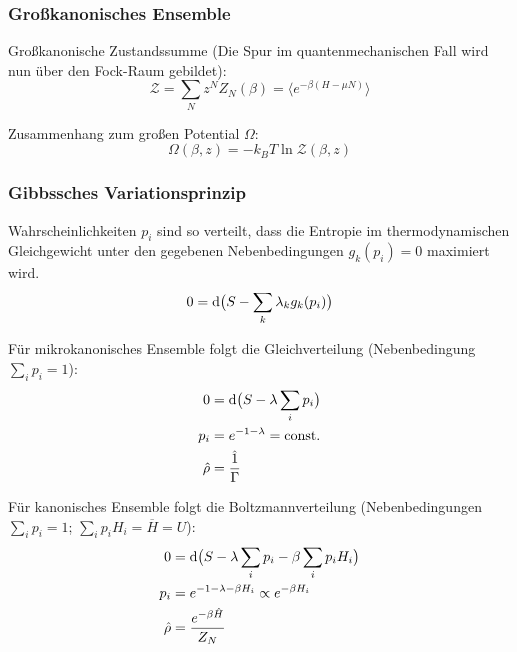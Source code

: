 		\subsubsection{Großkanonisches Ensemble}
			\noindent
			Großkanonische Zustandssumme (Die Spur im quantenmechanischen Fall wird nun über den Fock-Raum gebildet):
			\begin{equation}
				\mathcal{Z} = \sum_N z^N Z_N(\beta) = \langle e^{-\beta(H-\mu N)} \rangle
			\end{equation}

			\noindent
			Zusammenhang zum großen Potential $\Omega$:
			\begin{equation}
				\Omega(\beta,z) = -k_B T \ln \mathcal{Z}(\beta,z)
			\end{equation}


		\subsubsection{Gibbssches Variationsprinzip}
			\noindent
			Wahrscheinlichkeiten $p_i$ sind so verteilt, dass die Entropie im thermodynamischen Gleichgewicht unter den gegebenen Nebenbedingungen $g_k(p_i) = 0$ maximiert wird.
			\begin{equation}
				0 = \mathrm{d} \big( S - \sum_k \lambda_k g_k(p_i) \big)
			\end{equation}

			\noindent
			Für mikrokanonisches Ensemble folgt die Gleichverteilung (Nebenbedingung $\sum_i p_i = 1$):
			\begin{equation}
				\begin{aligned}
					0 &= \diff \big( S - \lambda \sum_i p_i \big) \\
					p_i &= e^{-1-\lambda} = \const \\
					\hat{\rho} &= \frac{\hat{1}}{\Gamma} \\ %
				\end{aligned}
			\end{equation}

			\noindent
			Für kanonisches Ensemble folgt die Boltzmannverteilung (Nebenbedingungen $\sum_i p_i = 1$; $\sum_i p_i H_i = \overline{H} = U$):
			\begin{equation}
				\begin{aligned}
					0 &= \mathrm{d} \big( S - \lambda \sum_i p_i - \beta \sum_i p_i H_i \big) \\
					p_i &= e^{-1-\lambda-\beta H_i} \propto e^{-\beta H_i} \\
					\hat{\rho} &= \frac{e^{-\beta \hat{H}}}{Z_N} \\
				\end{aligned}
			\end{equation}

